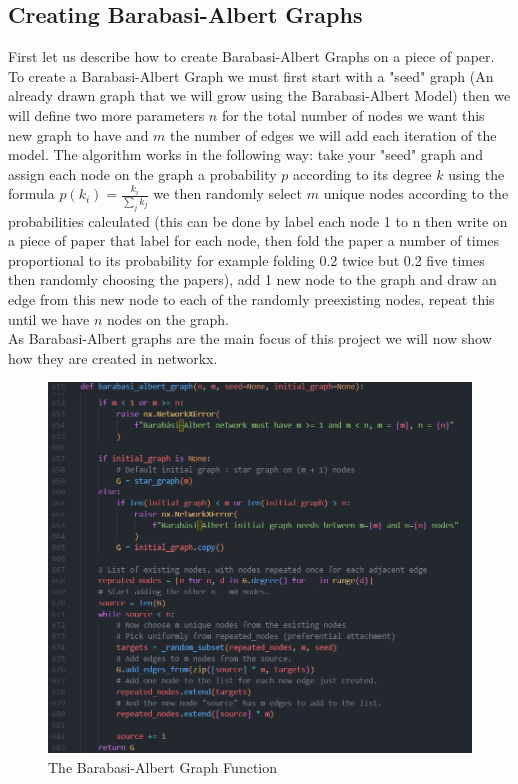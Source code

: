 \documentclass{article}
\begin{document}
        \subsection{Creating Barabasi-Albert Graphs}
        First let us describe how to create Barabasi-Albert Graphs on a piece of paper. To create a Barabasi-Albert Graph we must first start with a "seed" graph (An already drawn graph that we will grow using the Barabasi-Albert Model) then we will define two more parameters $n$ for the total number of nodes we want this new graph to have and $m$ the number of edges we will add each iteration of the model. The algorithm works in the following way: take your "seed" graph and assign each node on the graph a probability $p$ according to its degree $k$ using the formula $p(k_{i}) = \frac{k_{i}}{\sum_{j} {k_{j}}}$ we then randomly select $m$ unique nodes according to the probabilities calculated (this can be done by label each node 1 to n then write on a piece of paper that label for each node, then fold the paper a number of times proportional to its probability for example folding 0.2 twice but 0.2 five times then randomly choosing the papers), add 1 new node to the graph and draw an edge from this new node to each of the randomly preexisting nodes, repeat this until we have $n$ nodes on the graph.\\
        As Barabasi-Albert graphs are the main focus of this project we will now show how they are created in networkx. 
        \begin{figure}[H]
            \includegraphics[width=12cm]{images/BARABASI_FUNC.png}
            \caption{The Barabasi-Albert Graph Function}
            \label{fig:Barabasi-Albert function1}
        \end{figure}
\end{document}
